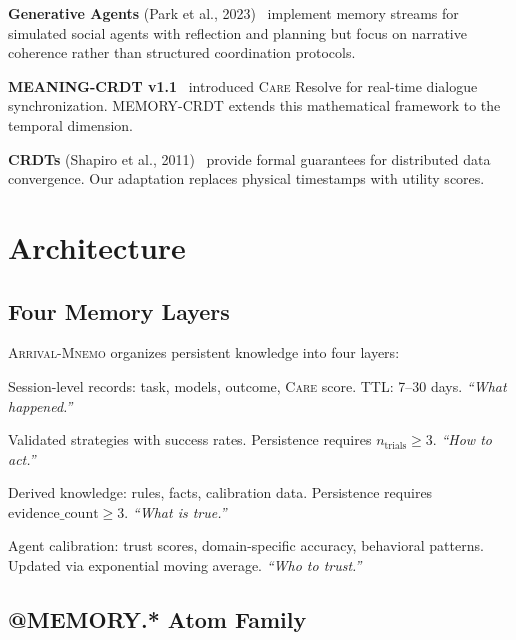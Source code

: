 \documentclass[11pt,a4paper]{article}
\newcommand{\mnemo}{\textsc{Arrival-Mnemo}\xspace}
\newcommand{\care}{\textsc{Care}\xspace}
\begin{document}
\textbf{Generative Agents} (Park et al., 2023)~\cite{park2023agents}
implement memory streams for simulated social agents with reflection
and planning but focus on narrative coherence rather than structured
coordination protocols.

\textbf{MEANING-CRDT v1.1}~\cite{kelevra2026crdt} introduced \care
Resolve for real-time dialogue synchronization.  MEMORY-CRDT extends
this mathematical framework to the temporal dimension.

\textbf{CRDTs} (Shapiro et al., 2011)~\cite{shapiro2011crdt} provide
formal guarantees for distributed data convergence.  Our adaptation
replaces physical timestamps with utility scores.

\section{Architecture}\label{sec:arch}

\subsection{Four Memory Layers}

\mnemo organizes persistent knowledge into four layers:

\begin{definitionbox}
\begin{description}[style=nextline]
  \item[Episodic] Session-level records: task, models, outcome, \care
    score. TTL: 7--30 days. \textit{``What happened.''}
  \item[Procedural] Validated strategies with success rates.
    Persistence requires $n_{\text{trials}} \geq 3$.
    \textit{``How to act.''}
  \item[Semantic] Derived knowledge: rules, facts, calibration data.
    Persistence requires $\text{evidence\_count} \geq 3$.
    \textit{``What is true.''}
  \item[Meta] Agent calibration: trust scores, domain-specific accuracy,
    behavioral patterns. Updated via exponential moving average.
    \textit{``Who to trust.''}
\end{description}
\end{definitionbox}

\subsection{@MEMORY.* Atom Family}
\end{document}
